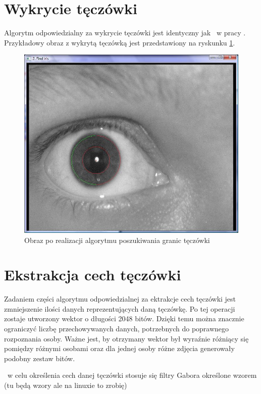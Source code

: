 \section{Wykrycie tęczówki}
\label{sec:wykrycieTeczowki}
Algorytm odpowiedzialny za wykrycie tęczówki jest identyczny jak ~w pracy \cite{Gl11}. Przykładowy obraz z wykrytą tęczówką jest przedstawiony na ryskunku \ref{fig:teczowkaNasza}.
\begin{figure}
\begin{center}
\includegraphics[scale=0.5]{teczowka.jpg}
\caption{Obraz po realizacji algorytmu poszukiwania granic tęczówki}
\label{fig:teczowkaNasza}
\end{center}
\end{figure}

\section{Ekstrakcja cech tęczówki}
\label{sec:ekstrakcja}
Zadaniem części algorytmu odpowiedzialnej za ektrakcje cech tęczówki jest zmniejszenie ilości danych reprezentujących daną tęczówkę. Po tej operacji zostaje utworzony wektor o długości 2048 bitów. Dzięki temu można znacznie ograniczyć liczbę przechowywanych danych, potrzebnych do poprawnego rozpoznania osoby. Ważne jest, by otrzymany wektor był wyraźnie różniący się pomiędzy różnymi osobami oraz dla jednej osoby różne zdjęcia generowały podobny zestaw bitów. 

~w celu określenia cech danej tęczówki stosuje się filtry Gabora określone wzorem (tu będą wzory ale na linuxie to zrobię)

